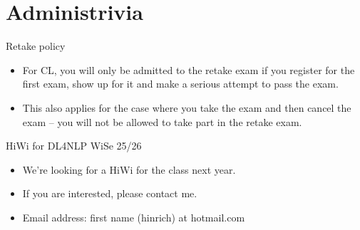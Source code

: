 \section{Administrivia}


\begin{vbframe}{Retake policy}

\vfill

	\begin{itemize}
\item
For CL, you will
only be admitted to the retake exam if you register for the
first exam, show up for it and make a serious attempt
to pass the exam.
\item This also applies for the case where you take the exam
and then cancel the exam -- you will not be allowed to take
part in the retake exam.
\end{itemize}

\vfill

\end{vbframe}

\begin{vbframe}{HiWi for DL4NLP WiSe 25/26}

\vfill

	\begin{itemize}
\item We're looking for a HiWi for the class next year.
\item If you are interested, please contact me.
\item Email
address:
first name (hinrich) at hotmail.com
\end{itemize}

\vfill

\end{vbframe}



%
%
%
%


\endlecture

